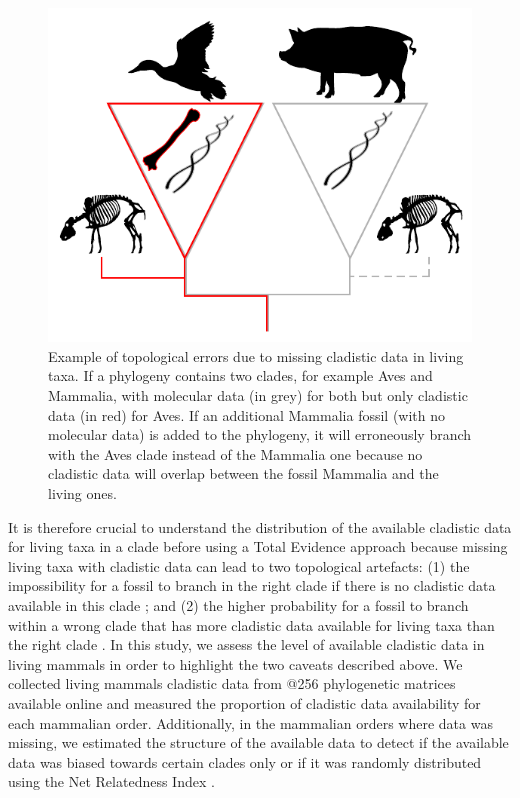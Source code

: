 \documentclass[12pt,letterpaper]{article}
\begin{document}
\begin{figure}[!htbp]
\centering
    \includegraphics[width=1\textwidth]{MissingDataFigure.pdf}
\caption{Example of topological errors due to missing cladistic data in living taxa.
If a phylogeny contains two clades, for example Aves and Mammalia, with molecular data (in grey) for both but only cladistic data (in red) for Aves.
If an additional Mammalia fossil (with no molecular data) is added to the phylogeny, it will erroneously branch with the Aves clade instead of the Mammalia one because no cladistic data will overlap between the fossil Mammalia and the living ones.}
\label{Figure_missing_data_problem}
\end{figure}

It is therefore crucial to understand the distribution of the available cladistic data for living taxa in a clade before using a Total Evidence approach because missing living taxa with cladistic data can lead to two topological artefacts: (1) the impossibility for a fossil to branch in the right clade if there is no cladistic data available in this clade \citep{GuillermeCooper}; and (2) the higher probability for a fossil to branch within a wrong clade that has more cladistic data available for living taxa than the right clade \citep{GuillermeCooper}.
In this study, we assess the level of available cladistic data in living mammals in order to highlight the two caveats described above.
We collected living mammals cladistic data from @256 phylogenetic matrices available online and measured the proportion of cladistic data availability for each mammalian order.
Additionally, in the mammalian orders where data was missing, we estimated the structure of the available data to detect if the available data was biased towards certain clades only or if it was randomly distributed using the Net Relatedness Index \citep{webb2002phylogenies}.
\end{document}
